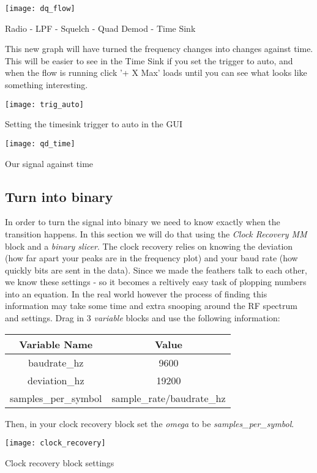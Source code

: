 \centrefigurestart
\texttt{[image: dq\_flow]}
\caption{Radio - LPF - Squelch - Quad Demod - Time Sink}
\centrefigureend

This new graph will have turned the frequency changes into changes against time. This will be easier to see in the Time Sink if you set the trigger to auto, and when the flow is running click '+ X Max' loads until you can see what looks like something interesting.


\centrefigurestart
\texttt{[image: trig\_auto]}
\caption{Setting the timesink trigger to auto in the GUI}
\centrefigureend



\centrefigurestart
\texttt{[image: qd\_time]}
\caption{Our signal against time}
\centrefigureend

\subsection{Turn into binary}

In order to turn the signal into binary we need to know exactly when the transition happens. In this section we will do that using the \textit{Clock Recovery MM} block and a \textit{binary slicer}. The clock recovery relies on knowing the deviation (how far apart your peaks are in the frequency plot) and your baud rate (how quickly bits are sent in the data). Since we made the feathers talk to each other, we know these settings - so it becomes a reltively easy task of plopping numbers into an equation. In the real world however the process of finding this information may take some time and extra snooping around the RF spectrum and settings. Drag in 3 \textit{variable} blocks and use the following information:

\begin{table}[H]
\begin{tabular}{|c|c|}
\hline
Variable Name & Value \\ \hline
baudrate\_hz & 9600 \\ \hline
deviation\_hz & 19200 \\ \hline
samples\_per\_symbol & sample\_rate/baudrate\_hz \\ \hline
\end{tabular}
\end{table}

Then, in your clock recovery block set the \textit{omega} to be \textit{samples\_per\_symbol}.

\centrefigurestart
\texttt{[image: clock\_recovery]}
\caption{Clock recovery block settings}
\centrefigureend

